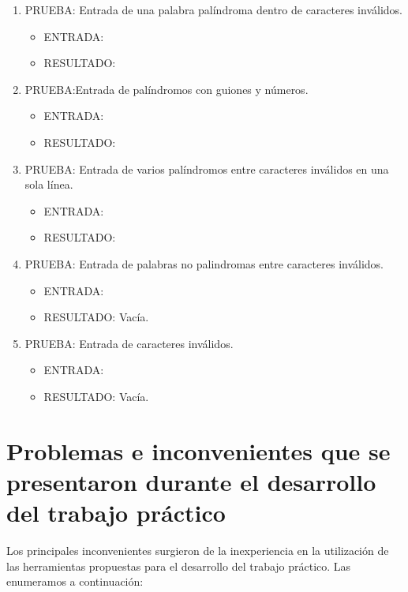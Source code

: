 \documentclass[a4paper,10pt]{article}
\begin{document}
\begin{enumerate}[1.]
	\item PRUEBA: Entrada de una palabra pal\'indroma dentro de caracteres inv\'alidos.\\
	\begin{itemize}
		\item ENTRADA:
		
		\item RESULTADO:
		
	\end{itemize}

	\item PRUEBA:Entrada de pal\'indromos con guiones y n\'umeros.\\
	\begin{itemize}
		\item ENTRADA:
		
		\item RESULTADO:
		
	\end{itemize}

	\item PRUEBA: Entrada de varios pal\'indromos entre caracteres inv\'alidos en una sola l\'inea.\\
	\begin{itemize}
		\item ENTRADA:
		
		\item RESULTADO:
		
	\end{itemize}

	\item PRUEBA: Entrada de palabras no palindromas entre caracteres inv\'alidos.\\
	\begin{itemize}
		\item ENTRADA:
		
		\item RESULTADO: Vac\'ia.
	\end{itemize}

	\item PRUEBA: Entrada de caracteres inv\'alidos.\\
	\begin{itemize}
		\item ENTRADA:
		
		\item RESULTADO: Vac\'ia.
	\end{itemize}
\end{enumerate}

\section{Problemas e inconvenientes que se presentaron durante el desarrollo del trabajo pr\'actico}
Los principales inconvenientes surgieron de la inexperiencia en la utilizaci\'on de las herramientas propuestas para el desarrollo del trabajo pr\'actico. Las enumeramos a continuaci\'on:
\end{document}
